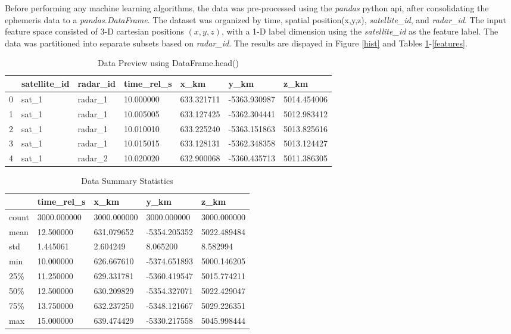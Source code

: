 \documentclass[./report_entry.tex]{subfiles}
\begin{document}
    \noindent Before performing any machine learning algorithms, the data was pre-processed using the \textit{pandas}
    python api, after consolidating the ephemeris data to a \textit{pandas.DataFrame}. 
    The dataset was organized by time, spatial position(x,y,z), \textit{satellite\_id}, and \textit{radar\_id}.
    The input feature space consisted of 3-D cartesian positions $(x,y,z)$, with a 1-D label dimension using the \textit{satellite\_id} as the feature label.
    The data was partitioned into separate subsets based on \textit{radar\_id}.
    The results are dispayed in Figure \ref{hist} and Tables \ref{panda_head}-\ref{features}.
    \clearpage
    \begin{table}[]
        \centering
        \caption{Data Preview using DataFrame.head()}
        \begin{tabular}{l|llllll}
            \cline{2-6}
          & satellite\_id & radar\_id & time\_rel\_s & x\_km      & y\_km        & z\_km       \\ \hline
        0 & sat\_1        & radar\_1  & 10.000000    & 633.321711 & -5363.930987 & 5014.454006 \\
        1 & sat\_1        & radar\_1  & 10.005005    & 633.127425 & -5362.304441 & 5012.983412 \\
        2 & sat\_1        & radar\_1  & 10.010010    & 633.225240 & -5363.151863 & 5013.825616 \\
        3 & sat\_1        & radar\_1  & 10.015015    & 633.128131 & -5362.348358 & 5013.124427 \\
        4 & sat\_1        & radar\_2  & 10.020020    & 632.900068 & -5360.435713 & 5011.386305 \\ \hline
        \end{tabular}
        \label{panda_head}
    \end{table}
    \begin{table}[]
        \centering
        \caption{Data Summary Statistics}
        \begin{tabular}{l|llll}
            \cline{2-5}
              & time\_rel\_s & x\_km       & y\_km        & z\_km       \\ \hline
        count & 3000.000000  & 3000.000000 & 3000.000000  & 3000.000000 \\
        mean  & 12.500000    & 631.079652  & -5354.205352 & 5022.489484 \\
        std   & 1.445061     & 2.604249    & 8.065200     & 8.582994    \\
        min   & 10.000000    & 626.667610  & -5374.651893 & 5000.146205 \\
        25\%  & 11.250000    & 629.331781  & -5360.419547 & 5015.774211 \\
        50\%  & 12.500000    & 630.209829  & -5354.327071 & 5022.429047 \\
        75\%  & 13.750000    & 632.237250  & -5348.121667 & 5029.226351 \\
        max   & 15.000000    & 639.474429  & -5330.217558 & 5045.998444 \\ \hline
        \end{tabular}
        \label{stats}
    \end{table}
\end{document}

